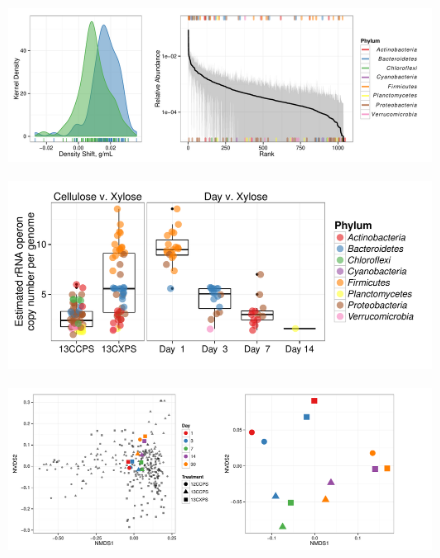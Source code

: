 \begin{figure}[H]
	\begin{center}
	\centerline{\includegraphics[width=\textwidth]{figures/shift_and_rabund2/shift_and_rabund.pdf}}
	\caption{\protect}\label{fig:shift}
        \end{center}
\end{figure}

\begin{figure}[H]
	\begin{center}
	\centerline{\includegraphics[width=\textwidth]{figures/copy_number/copy_number.pdf}}
	\caption{\protect}\label{fig:copy}
        \end{center}
\end{figure}

\begin{figure}[H]
	\begin{center}
		\centerline{\includegraphics[width=\textwidth]{figures/bulk_ordination/bulk_ordination.pdf}}
	\caption{\protect}\label{fig:bulk_ord}
        \end{center}
\end{figure}



